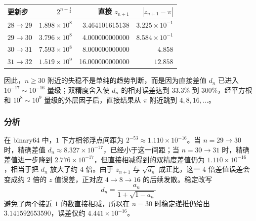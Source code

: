 \documentclass[12pt,a4paper,fontset=none]{ctexart}
\newcommand{\blocktitle}[1]{\subsubsection{#1}}
\newcounter{none}
\begin{document}
{\def\LTcaptype{none} %
\begin{longtable}[]{@{}lrrr@{}}
\toprule\noalign{}
更新步 & \(2^{n-\frac12}\) & 直接 \(z_{n+1}\) & \(|z_{n+1}-\pi|\) \\
\midrule\noalign{}
\endhead
\bottomrule\noalign{}
\endlastfoot
\(28\to29\) & \(1.898\times10^{8}\) & 3.464101615138 & \(3.225\times10^{-1}\) \\
\(29\to30\) & \(3.796\times10^{8}\) & 4.000000000000 & \(8.584\times10^{-1}\) \\
\(30\to31\) & \(7.593\times10^{8}\) & 8.000000000000 & \(4.858\) \\
\(31\to32\) & \(1.519\times10^{9}\) & 16.000000000000 & \(12.858\) \\
\end{longtable}
}

因此，\(n\ge 30\) 附近的失稳不是单纯的趋势判断，而是因为直接差值 \(d_n\) 已进入 \(10^{-17}\sim10^{-16}\) 量级；双精度舍入使 \(d_n\) 的相对误差达到 \(33.3\%\) 到 \(300\%\)，经平方根和 \(10^8\sim10^9\) 量级的外层因子后，直接结果从 \(\pi\) 附近跳到 \(4,8,16,\ldots\)。

\blocktitle{分析}

在 binary64 中，\(1\) 下方相邻浮点间距为 \(2^{-53}\approx1.110\times10^{-16}\)。当 \(n=29\to30\) 时，精确差值 \(d_n\approx8.327\times10^{-17}\)，已经小于这一间距；当 \(n=30\to31\) 时，精确差值进一步降到 \(2.776\times10^{-17}\)，但直接相减得到的双精度差值仍为 \(1.110\times10^{-16}\)，相当于把 \(d_n\) 放大了约 \(4\) 倍。由于 \(z_{n+1}\) 与 \(\sqrt{d_n}\) 成正比，这一 \(4\) 倍差值误差会变成约 \(2\) 倍的 \(z\) 值误差，正对应 \(4\to8\to16\) 的后续发散。稳定改写
\[
d_n=\frac{a_n}{1+\sqrt{1-a_n}}
\]
避免了两个接近 \(1\) 的数直接相减，所以在 \(n=30\) 时稳定递推仍给出 \(3.141592653590\)，误差仅约 \(4.441\times10^{-16}\)。
\end{document}

